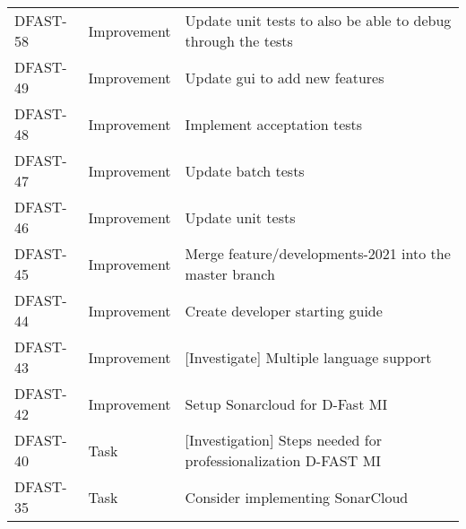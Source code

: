\documentclass[git]{deltares_manual}
\begin{document}
\begin{longtable}{l|l|p{8cm}}
DFAST-58 & Improvement & Update unit tests to also be able to debug through the tests \\
DFAST-49 & Improvement & Update gui to add new features \\
DFAST-48 & Improvement & Implement acceptation tests \\
DFAST-47 & Improvement & Update batch tests \\
DFAST-46 & Improvement & Update unit tests \\
DFAST-45 & Improvement & Merge feature/developments-2021 into the master branch \\
DFAST-44 & Improvement & Create developer starting guide \\
DFAST-43 & Improvement & [Investigate] Multiple language support \\
DFAST-42 & Improvement & Setup Sonarcloud for D-Fast MI \\
DFAST-40 & Task & [Investigation] Steps needed for professionalization D-FAST MI \\
DFAST-35 & Task & Consider implementing SonarCloud  \\
\end{longtable}

\pagestyle{empty}
\cleardoublepage
\mbox{}
\end{document}

